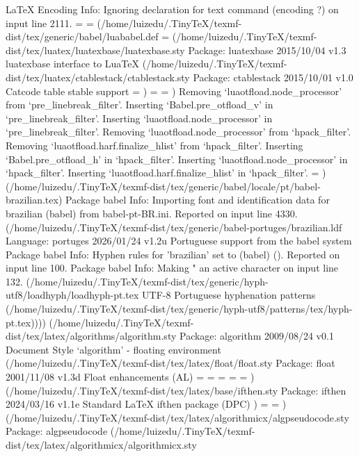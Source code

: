 LaTeX Encoding Info:    Ignoring declaration for text command \SS (encoding ?) on input line 2111.
\U@D=
\l@unhyphenated=
(/home/luizedu/.TinyTeX/texmf-dist/tex/generic/babel/luababel.def
\bbl@attr@locale=
(/home/luizedu/.TinyTeX/texmf-dist/tex/luatex/luatexbase/luatexbase.sty
Package: luatexbase 2015/10/04 v1.3 luatexbase interface to LuaTeX 
(/home/luizedu/.TinyTeX/texmf-dist/tex/luatex/ctablestack/ctablestack.sty
Package: ctablestack 2015/10/01 v1.0 Catcode table stable support
\@catcodetablestackcnt=
)
\CatcodeTableOther=
\CatcodeTableExpl=
)
Removing  `luaotfload.node_processor' from `pre_linebreak_filter'.
Inserting `Babel.pre_otfload_v' in `pre_linebreak_filter'.
Inserting `luaotfload.node_processor' in `pre_linebreak_filter'.
Removing  `luaotfload.node_processor' from `hpack_filter'.
Removing  `luaotfload.harf.finalize_hlist' from `hpack_filter'.
Inserting `Babel.pre_otfload_h' in `hpack_filter'.
Inserting `luaotfload.node_processor' in `hpack_filter'.
Inserting `luaotfload.harf.finalize_hlist' in `hpack_filter'.
\bbl@attr@dir=
) (/home/luizedu/.TinyTeX/texmf-dist/tex/generic/babel/locale/pt/babel-brazilian.tex)
Package babel Info: Importing font and identification data for brazilian
(babel)             from babel-pt-BR.ini. Reported on input line 4330.
(/home/luizedu/.TinyTeX/texmf-dist/tex/generic/babel-portuges/brazilian.ldf
Language: portuges 2026/01/24 v1.2u Portuguese support from the babel system
Package babel Info: Hyphen rules for 'brazilian' set to \l@portuguese
(babel)             (). Reported on input line 100.
Package babel Info: Making " an active character on input line 132.
(/home/luizedu/.TinyTeX/texmf-dist/tex/generic/hyph-utf8/loadhyph/loadhyph-pt.tex UTF-8 Portuguese hyphenation patterns (/home/luizedu/.TinyTeX/texmf-dist/tex/generic/hyph-utf8/patterns/tex/hyph-pt.tex)))) (/home/luizedu/.TinyTeX/texmf-dist/tex/latex/algorithms/algorithm.sty
Package: algorithm 2009/08/24 v0.1 Document Style `algorithm' - floating environment
(/home/luizedu/.TinyTeX/texmf-dist/tex/latex/float/float.sty
Package: float 2001/11/08 v1.3d Float enhancements (AL)
\c@float@type=
\float@exts=
\float@box=
\@float@everytoks=
\@floatcapt=
) (/home/luizedu/.TinyTeX/texmf-dist/tex/latex/base/ifthen.sty
Package: ifthen 2024/03/16 v1.1e Standard LaTeX ifthen package (DPC)
)
\@float@every@algorithm=
\c@algorithm=
) (/home/luizedu/.TinyTeX/texmf-dist/tex/latex/algorithmicx/algpseudocode.sty
Package: algpseudocode 
(/home/luizedu/.TinyTeX/texmf-dist/tex/latex/algorithmicx/algorithmicx.sty

